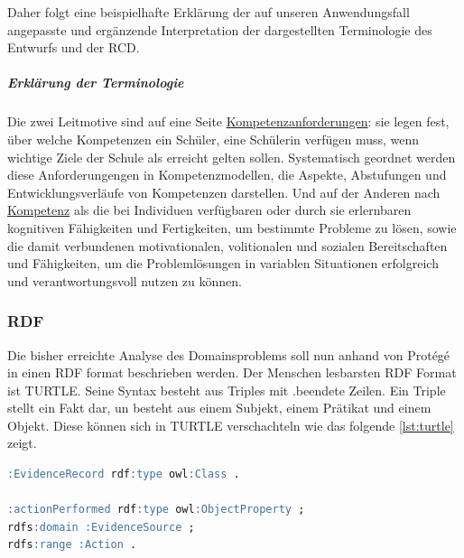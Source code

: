 \documentclass[
12pt,
english,
ngerman,
headsepline,
twoside,
openright,
numbers=noenddot,version=first
]{scrreprt}
\begin{document}
Daher folgt eine beispielhafte Erklärung der auf unseren Anwendungsfall angepasste und ergänzende Interpretation der dargestellten Terminologie des Entwurfs und der RCD.




\subparagraph{Erklärung der Terminologie}Die zwei Leitmotive sind auf eine Seite \underline{Kompetenzanforderungen}: sie legen fest, über welche Kompetenzen ein Schüler, eine Schülerin verfügen muss, wenn wichtige Ziele der Schule als erreicht gelten sollen. Systematisch geordnet werden diese Anforderungengen in Kompetenzmodellen, die Aspekte, Abstufungen und Entwicklungsverläufe von Kompetenzen darstellen\cite{competence}. Und auf der Anderen nach \underline{\Gls{Kompetenz}} als die bei Individuen verfügbaren oder durch sie erlernbaren kognitiven Fähigkeiten und Fertigkeiten, um bestimmte Probleme zu lösen, sowie die damit verbundenen motivationalen, volitionalen und sozialen Bereitschaften und Fähigkeiten, um die Problemlösungen in variablen Situationen erfolgreich und verantwortungsvoll nutzen zu können\cite{weinert2002leistungsmessungen}.

\subsubsection{RDF}
Die bisher erreichte Analyse des Domainsproblems soll nun anhand von Protégé in einen \acrfull{RDF} format beschrieben werden. Der Menschen lesbarsten \acrshort{RDF} Format ist \acrfull{TURTLE}. Seine Syntax besteht aus Triples mit \glqq .\grqq beendete Zeilen. Ein Triple stellt ein Fakt dar, un besteht aus einem Subjekt, einem Prätikat und einem Objekt. Diese können sich in TURTLE verschachteln wie das folgende \autoref{lst:turtle} zeigt. 

\begin{lstlisting}[language=SQL,caption={Darstellung von Triples in TURTLE},label={lst:turtle}]
:EvidenceRecord rdf:type owl:Class .

:actionPerformed rdf:type owl:ObjectProperty ;
rdfs:domain :EvidenceSource ;
rdfs:range :Action .
\end{lstlisting}
\end{document}
